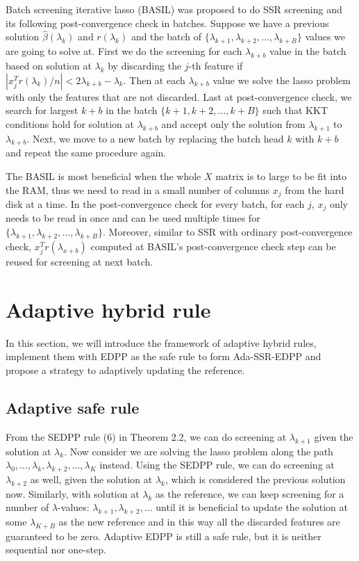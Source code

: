 Batch screening iterative lasso (BASIL) \citep{qian2019fast} was proposed to do SSR screening and its following post-convergence check in batches. Suppose we have a previous solution $\hat{\beta}(\lambda_k)$ and $r(\lambda_k)$ and the batch of $\{\lambda_{k+1},\lambda_{k+2},...,\lambda_{k+B}\}$ values we are going to solve at. First we do the screening for each $\lambda_{k+b}$ value in the batch based on solution at $\lambda_k$ by discarding the $j$-th feature if $|x_j^Tr(\lambda_k)/n|<2\lambda_{k+b}-\lambda_k$. Then at each $\lambda_{k+b}$ value we solve the lasso problem with only the features that are not discarded. Last at post-convergence check, we search for largest $k+b$ in the batch $\{k+1,k+2,...,k+B\}$ such that KKT conditions hold for solution at $\lambda_{k+b}$ and accept only the solution from $\lambda_{k+1}$ to $\lambda_{k+b}$. Next, we move to a new batch by replacing the batch head $k$ with $k+b$ and repeat the same procedure again.

The BASIL is most beneficial when the whole $X$ matrix is to large to be fit into the RAM, thus we need to read in a small number of columns $x_j$ from the hard disk at a time. In the post-convergence check for every batch, for each $j$, $x_j$ only needs to be read in once and can be used multiple times for $\{\lambda_{k+1},\lambda_{k+2},...,\lambda_{k+B}\}$. Moreover, similar to SSR with ordinary post-convergence check, $x_j^Tr(\lambda_{x+b})$ computed at BASIL's post-convergence check step can be reused for screening at next batch.




\section{Adaptive hybrid rule}
\label{sec:method}

In this section, we will introduce the framework of adaptive hybrid rules, implement them with EDPP as the safe rule to form Ada-SSR-EDPP and propose a strategy to adaptively updating the reference.

\subsection{Adaptive safe rule}

From the SEDPP rule (6) in Theorem 2.2, we can do screening at $\lambda_{k+1}$ given the solution at $\lambda_k$. Now consider we are solving the lasso problem along the path $\lambda_0,...,\lambda_k,\lambda_{k+2},...,\lambda_K$ instead. Using the SEDPP rule, we can do screening at $\lambda_{k+2}$ as well, given the solution at $\lambda_k$, which is considered the previous solution now. Similarly, with solution at $\lambda_k$ as the reference, we can keep screening for a number of $\lambda$-values: $\lambda_{k+1},\lambda_{k+2},...$ until it is beneficial to update the solution at some $\lambda_{K+B}$ as the new reference and in this way all the discarded features are guaranteed to be zero. Adaptive EDPP is still a safe rule, but it is neither sequential nor one-step.

